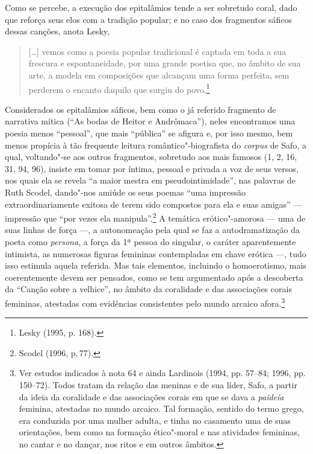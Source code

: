 Como se percebe, a execução dos epitalâmios tende a ser sobretudo coral, dado
que reforça seus elos com a tradição popular; e no caso dos fragmentos sáficos
dessas canções, anota Lesky, 

\begin{quote}
\mbox[\ldots{}] vemos como a poesia popular
tradicional é captada em toda a sua frescura e espontaneidade, por uma grande
poetisa que, no âmbito de sua arte, a modela em composições que alcançam uma
forma perfeita, sem perderem o encanto daquilo que surgiu do povo.\footnote{ Lesky (1995, p. 168).}
\end{quote}

Considerados os epitalâmios sáficos, bem como o já referido fragmento de
narrativa mítica (“As bodas de Heitor e Andrômaca”), neles
encontramos uma poesia menos “pessoal”, que mais ``pública'' se afigura e, por isso mesmo, bem menos propícia à tão frequente leitura romântico"-biografista do \textit{corpus} de
Safo, a qual, voltando"-se aos outros fragmentos, sobretudo aos mais famosos (1, 2, 16, 31, 94, 96), insiste em tomar por íntima, pessoal e privada a voz de seus versos, nos quais ela se revela “a maior mestra em pseudointimidade”, nas palavras de Ruth Scodel, dando"-nos amiúde os seus poemas “uma impressão extraordinariamente exitosa de terem sido compostos para ela e suas amigas” --- impressão que “por vezes ela manipula”.\footnote{Scodel (1996, p.\,77).}
A temática
erótico"-amorosa --- uma de suas linhas de força ---, a autonomeação
pela qual se faz a autodramatização da poeta como \textit{persona}, a força da 1ª pessoa do singular, o caráter
aparentemente intimista, as numerosas figuras
femininas contempladas em chave erótica ---, tudo isso estimula aquela referida.
Mas tais elementos, incluindo o homoerotismo, mais coerentemente devem ser pensados, como se tem argumentado após a descoberta da ``Canção sobre a velhice'', no âmbito da coralidade e das associações corais femininas, atestadas com evidências consistentes pelo mundo arcaico afora.\footnote{Ver estudos indicados à nota 64 e ainda Lardinois (1994, pp. 57--84; 1996, pp. 150--72). Todos tratam da relação das meninas e de sua líder, Safo, a partir da ideia da coralidade e das associações corais em que se dava a \textit{paideía} feminina, atestadas no mundo arcaico. Tal formação, sentido do termo grego, era conduzida por uma mulher adulta, e tinha no casamento uma de suas orientações, bem como na formação ético"-moral e nas atividades femininas, no cantar e no dançar, nos ritos e em outros âmbitos.} 

